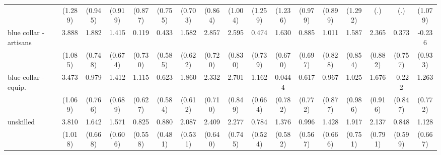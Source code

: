 {\begin{tabular}{l*{16}{c}}
                    &     (1.289)         &     (0.945)         &     (0.919)         &     (0.877)         &     (0.755)         &     (0.703)         &     (0.864)         &     (1.004)         &     (1.259)         &     (1.236)         &     (0.979)         &     (0.899)         &     (1.292)         &         (.)         &         (.)         &     (1.079)         \\
[1em]
blue collar - artisans&       3.888\sym{***}&       1.882\sym{*}  &       1.415\sym{*}  &       0.119         &       0.433         &       1.582\sym{*}  &       2.857\sym{***}&       2.595\sym{**} &       0.474         &       1.630\sym{*}  &       0.885         &       1.011         &       1.587         &       2.365\sym{**} &       0.373         &      -0.236         \\
                    &     (1.085)         &     (0.748)         &     (0.674)         &     (0.730)         &     (0.585)         &     (0.622)         &     (0.720)         &     (0.830)         &     (0.739)         &     (0.670)         &     (0.697)         &     (0.828)         &     (0.854)         &     (0.882)         &     (0.757)         &     (0.933)         \\
[1em]
blue collar - equip.&       3.473\sym{**} &       0.979         &       1.412\sym{*}  &       1.115         &       0.623         &       1.860\sym{**} &       2.332\sym{**} &       2.701\sym{**} &       1.162         &      0.0444         &       0.617         &       0.967         &       1.025         &       1.676         &      -0.222         &       1.263         \\
                    &     (1.069)         &     (0.766)         &     (0.689)         &     (0.627)         &     (0.584)         &     (0.612)         &     (0.710)         &     (0.849)         &     (0.664)         &     (0.782)         &     (0.772)         &     (0.877)         &     (0.986)         &     (0.916)         &     (0.847)         &     (0.772)         \\
[1em]
unskilled           &       3.810\sym{***}&       1.642\sym{*}  &       1.571\sym{**} &       0.825         &       0.880         &       2.087\sym{***}&       2.409\sym{***}&       2.277\sym{**} &       0.784         &       1.376\sym{*}  &       0.996         &       1.428\sym{*}  &       1.917\sym{*}  &       2.137\sym{**} &       0.848         &       1.128         \\
                    &     (1.018)         &     (0.668)         &     (0.606)         &     (0.558)         &     (0.481)         &     (0.531)         &     (0.640)         &     (0.745)         &     (0.524)         &     (0.582)         &     (0.567)         &     (0.666)         &     (0.751)         &     (0.791)         &     (0.599)         &     (0.667)         \\

\end{tabular}}

